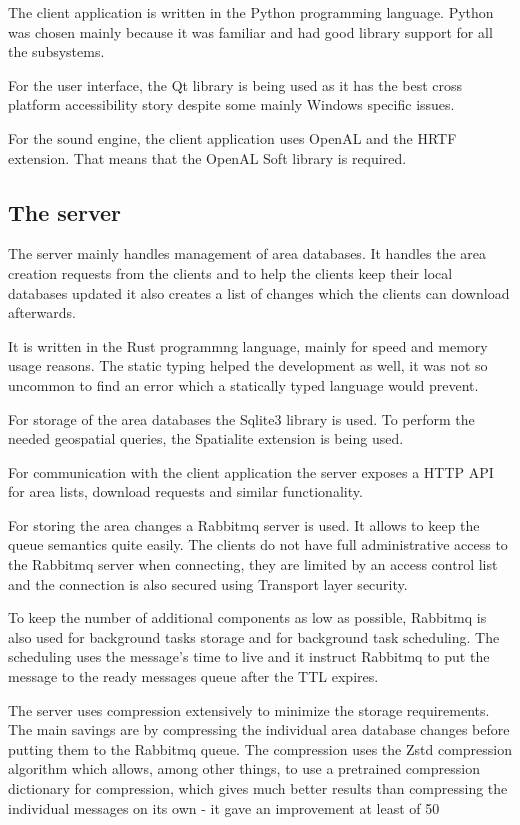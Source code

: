 \documentclass[nolof,digital]{fithesis3}
\begin{document}
The client application is written in the Python programming language. Python was chosen mainly because it was familiar and had good library support for all the subsystems.

For the user interface, the Qt library is being used as it has the best cross platform accessibility story despite some mainly Windows specific issues.

For the sound engine, the client application uses OpenAL and the HRTF extension. That means that the OpenAL Soft library is required.
\subsection{The server}
The server mainly handles management of area databases. It handles the area creation requests from the clients and to help the clients keep their local databases updated it also creates a list of changes which the clients can download afterwards.

It is written in the Rust programmng language, mainly for speed and memory usage reasons. The static typing helped the development as well, it was not so uncommon to find an error which a statically typed language would prevent.

For storage of the area databases the Sqlite3 library is used. To perform the needed geospatial queries, the Spatialite extension is being used.

For communication with the client application the server exposes a HTTP API for area lists, download requests and similar functionality. 

For storing the area changes a Rabbitmq server is used. It allows to keep the queue semantics quite easily. The clients do not have full administrative access to the Rabbitmq server when connecting, they are limited by an access control list and the connection is also secured using Transport layer security.

To keep the number of additional components as low as possible, Rabbitmq is also used for background tasks storage and for background task scheduling. The scheduling uses the message's time to live and it instruct Rabbitmq to put the message to the ready messages queue after the TTL expires.

The server uses compression extensively to minimize the storage requirements. The main savings are by compressing the individual area database changes before putting them to the Rabbitmq queue. The compression uses the Zstd compression algorithm which allows, among other things, to use a pretrained compression dictionary for compression, which gives much better results than compressing the individual messages on its own - it gave an improvement at least of 50%
\end{document}
